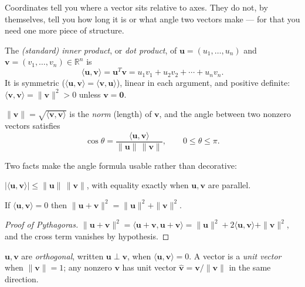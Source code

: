 Coordinates tell you where a vector sits relative to axes. They do not, by
themselves, tell you how long it is or what angle two vectors make --- for
that you need one more piece of structure.

\begin{definition}
The \emph{(standard) inner product}, or \emph{dot product}, of
$\mathbf u=(u_1,\dots,u_n)$ and $\mathbf v=(v_1,\dots,v_n)\in\mathbb R^n$ is
\[
\langle\mathbf u,\mathbf v\rangle=\mathbf u^{T}\mathbf v
=u_1v_1+u_2v_2+\cdots+u_nv_n .
\]
It is symmetric ($\langle\mathbf u,\mathbf v\rangle=\langle\mathbf v,\mathbf u\rangle$),
linear in each argument, and positive definite:
$\langle\mathbf v,\mathbf v\rangle=\|\mathbf v\|^2>0$ unless $\mathbf v=\mathbf 0$.
\end{definition}

\begin{definition}
$\|\mathbf v\|=\sqrt{\langle\mathbf v,\mathbf v\rangle}$ is the \emph{norm} (length)
of $\mathbf v$, and the angle between two nonzero vectors satisfies
\[
\cos\theta=\frac{\langle\mathbf u,\mathbf v\rangle}{\|\mathbf u\|\,\|\mathbf v\|},
\qquad 0\le\theta\le\pi .
\]
\end{definition}

Two facts make the angle formula usable rather than decorative:

\begin{theorem}
$|\langle\mathbf u,\mathbf v\rangle|\le\|\mathbf u\|\,\|\mathbf v\|$, with equality
exactly when $\mathbf u,\mathbf v$ are parallel.
\end{theorem}

\begin{theorem}[Pythagoras]
If $\langle\mathbf u,\mathbf v\rangle=0$ then
$\|\mathbf u+\mathbf v\|^2=\|\mathbf u\|^2+\|\mathbf v\|^2$.
\end{theorem}

\begin{proof}[Proof of Pythagoras]
$\|\mathbf u+\mathbf v\|^2=\langle\mathbf u+\mathbf v,\mathbf u+\mathbf v\rangle
=\|\mathbf u\|^2+2\langle\mathbf u,\mathbf v\rangle+\|\mathbf v\|^2$, and the
cross term vanishes by hypothesis.
\end{proof}

\begin{definition}
$\mathbf u,\mathbf v$ are \emph{orthogonal}, written $\mathbf u\perp\mathbf v$,
when $\langle\mathbf u,\mathbf v\rangle=0$. A vector is a \emph{unit vector}
when $\|\mathbf v\|=1$; any nonzero $\mathbf v$ has unit vector
$\hat{\mathbf v}=\mathbf v/\|\mathbf v\|$ in the same direction.
\end{definition}

